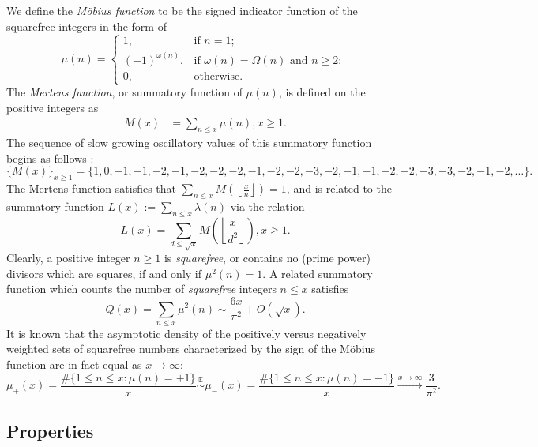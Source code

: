 \documentclass[11pt,reqno,a4letter]{article}
\numberwithin{figure}{section}
\numberwithin{table}{section}
\newcommand{\cf}{\textit{cf.\ }}
\newcommand{\seqnum}[1]{\href{http://oeis.org/#1}{\color{ProcessBlue}{\underline{#1}}}}
\newcommand{\Floor}[2]{\ensuremath{\left\lfloor \frac{#1}{#2} \right\rfloor}}
\theoremstyle{plain}
\numberwithin{theorem}{section}
\theoremstyle{definition}
\begin{document}
We define the \emph{M\"obius function} to be the signed indicator function 
of the squarefree integers in the form of \cite[\seqnum{A008683}]{OEIS} 
\[
\mu(n) = \begin{cases} 
     1, & \text{if $n = 1$; } \\ 
     (-1)^{\omega(n)}, & \text{if $\omega(n) = \Omega(n)$ and $n \geq 2$; } \\ 
     0, & \text{otherwise.} 
     \end{cases} 
\]
The \emph{Mertens function}, or summatory function of $\mu(n)$, is defined on the 
positive integers as 
\begin{align*} 
M(x) & = \sum_{n \leq x} \mu(n), x \geq 1. 
\end{align*} 
The sequence of slow growing oscillatory values of this 
summatory function begins as follows \cite[\seqnum{A002321}]{OEIS}: 
\[
\{M(x)\}_{x \geq 1} = \{1, 0, -1, -1, -2, -1, -2, -2, -2, -1, -2, -2, -3, -2, 
     -1, -1, -2, -2, -3, -3, -2, -1, -2, \ldots\}. 
\] 
The Mertens function satisfies that $\sum_{n \leq x} M\left(\Floor{x}{n}\right) = 1$, and is related 
to the summatory function $L(x) := \sum_{n \leq x} \lambda(n)$ via the relation 
\cite{LEHMAN-1960} 
\[
L(x) = \sum_{d \leq \sqrt{x}} M\left(\Floor{x}{d^2}\right), x \geq 1. 
\]
Clearly, a positive integer $n \geq 1$ is \emph{squarefree}, or contains no (prime power) divisors which are 
squares, if and only if $\mu^2(n) = 1$. 
A related summatory function which counts the 
number of \emph{squarefree} integers $n \leq x$ satisfies 
\cite[\S 18.6]{HARDYWRIGHT} \cite[\seqnum{A013928}]{OEIS} 
\[ 
Q(x) = \sum_{n \leq x} \mu^2(n) \sim \frac{6x}{\pi^2} + O\left(\sqrt{x}\right). 
\] 
It is known that the asymptotic density of the positively versus negatively 
weighted sets of squarefree numbers characterized by the sign of the 
M\"obius function are in fact equal as $x \rightarrow \infty$: 
\[
\mu_{+}(x) = \frac{\#\{1 \leq n \leq x: \mu(n) = +1\}}{x} \overset{\mathbb{E}}{\sim} 
     \mu_{-}(x) = \frac{\#\{1 \leq n \leq x: \mu(n) = -1\}}{x} 
     \xrightarrow{x \rightarrow \infty} \frac{3}{\pi^2}. 
\]

\subsection{Properties} 
\end{document}
